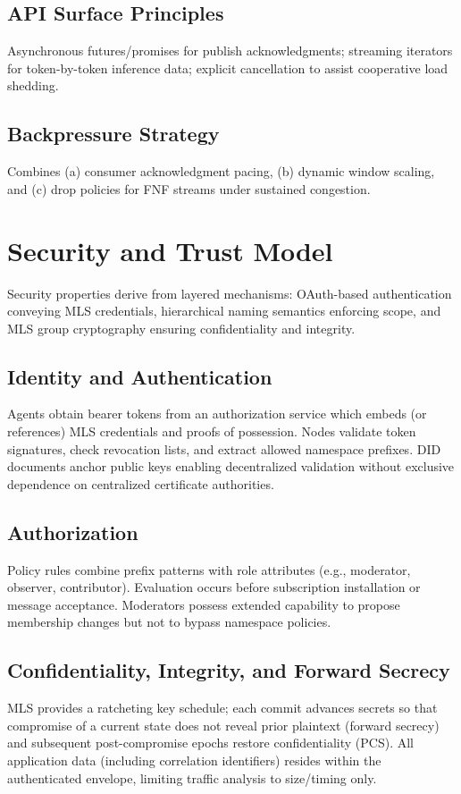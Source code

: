 \documentclass{article}
\theoremstyle{definition}
\theoremstyle{remark}
\begin{document}
\subsection{API Surface Principles}
Asynchronous futures/promises for publish acknowledgments; streaming iterators for token-by-token inference data; explicit cancellation to assist cooperative load shedding.
\subsection{Backpressure Strategy}
Combines (a) consumer acknowledgment pacing, (b) dynamic window scaling, and (c) drop policies for FNF streams under sustained congestion.

\section{Security and Trust Model}\label{sec:security}
Security properties derive from layered mechanisms: OAuth-based authentication conveying MLS credentials, hierarchical naming semantics enforcing scope, and MLS group cryptography ensuring confidentiality and integrity.
\subsection{Identity and Authentication}
Agents obtain bearer tokens from an authorization service which embeds (or references) MLS credentials and proofs of possession. Nodes validate token signatures, check revocation lists, and extract allowed namespace prefixes. DID documents anchor public keys enabling decentralized validation without exclusive dependence on centralized certificate authorities.
\subsection{Authorization}
Policy rules combine prefix patterns with role attributes (e.g., moderator, observer, contributor). Evaluation occurs before subscription installation or message acceptance. Moderators possess extended capability to propose membership changes but not to bypass namespace policies.
\subsection{Confidentiality, Integrity, and Forward Secrecy}
MLS provides a ratcheting key schedule; each commit advances secrets so that compromise of a current state does not reveal prior plaintext (forward secrecy) and subsequent post-compromise epochs restore confidentiality (PCS). All application data (including correlation identifiers) resides within the authenticated envelope, limiting traffic analysis to size/timing only.
\end{document}
